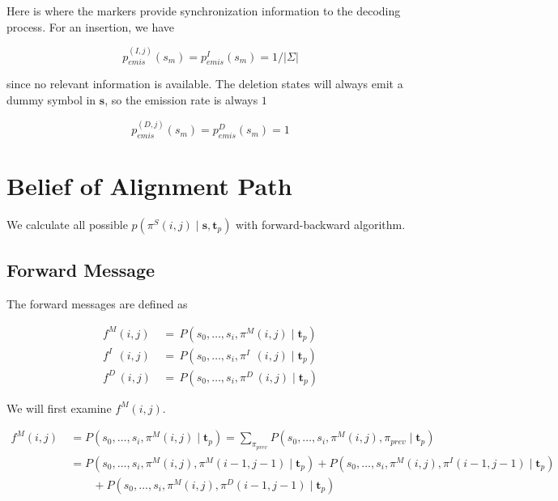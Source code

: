 \documentclass[10pt]{article}
\begin{document}
  Here is where the markers provide synchronization information to the decoding process. For an insertion, we have

  \begin{equation}
    p_{emis}^{(I, j)}(s_m) = p_{emis}^{I}(s_m) = 1 / |\Sigma|
  \end{equation}

  since no relevant information is available. The deletion states will always emit a dummy symbol in $\mathbf{s}$, so the emission rate is always $1$

  \begin{equation}
    p_{emis}^{(D, j)}(s_m) =  p_{emis}^{D}(s_m) =  1
  \end{equation}

    
\section{Belief of Alignment Path}

  We calculate all possible $p\left(\pi^S(i, j) \;|\; \mathbf{s}, \mathbf{t}_p\right)$ with forward-backward algorithm.

  \subsection{Forward Message}
    
    The forward messages are defined as

    \begin{equation}
    \begin{aligned}
      f^{M}(i, j) \,&=\, P(s_0, \dots,s_i, \pi^M(i, j) \;|\; \mathbf{t}_{p}) \\
      f^{I\;\;}(i, j) \,&=\, P(s_0, \dots,s_i, \pi^{I\;\;}(i, j) \;|\; \mathbf{t}_{p}) \\
      f^{D\;}(i, j) \,&=\, P(s_0, \dots,s_i, \pi^{D\;}(i, j) \;|\; \mathbf{t}_{p})
    \end{aligned}
    \end{equation}

    We will first examine $f^{M}(i, j)$.

    \begin{equation} \label{eq111}
    \begin{aligned}
      f^{M}(i, j) \
        &= P(s_0, \dots,s_i, \pi^M(i, j) \;|\; \mathbf{t}_{p}) = \sum\nolimits_{\pi_{prev}} P(s_0, \dots,s_i, \pi^M(i, j), \pi_{prev} \;|\; \mathbf{t}_{p}) \\
        &= P(s_0, \dots,s_i, \pi^M(i, j), \pi^M(i-1, j-1) \;|\; \mathbf{t}_{p}) + P( s_0, \dots,s_i, \pi^M(i, j), \pi^{I}(i-1, j-1) \;|\; \mathbf{t}_{p})  \\
        &\qquad + P(s_0, \dots,s_i, \pi^M(i, j), \pi^{D}(i-1, j-1) \;|\; \mathbf{t}_{p})
    \end{aligned}
    \end{equation}
\end{document}
